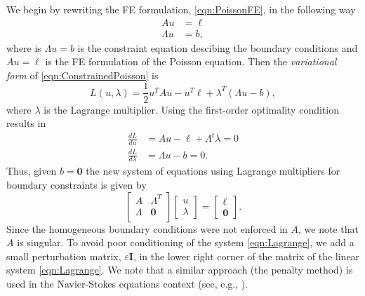 We begin by rewriting the FE formulation, \eqref{eqn:PoissonFE}, in the
following way
\begin{equation}
  \begin{split}
    A u &= \ell \\
    \Lambda u &= b,
  \end{split}
  \label{eqn:ConstrainedPoisson}
\end{equation}
where is $\Lambda u = b$ is the constraint equation descibing the boundary
conditions and $A u = \ell$ is the FE formulation of the Poisson equation.
Then the \emph{variational form} of \eqref{eqn:ConstrainedPoisson} is
\begin{equation}
  L(u,\lambda) = \frac{1}{2}u^T A u - u^T \ell + \lambda^T (\Lambda u - b),
  \label{eqn:Variational}
\end{equation}
where $\lambda$ is the Lagrange multiplier. Using the first-order optimality
condition results in
\begin{equation}
  \begin{split}
    \frac{d L}{du} &= Au - \ell + \Lambda^t \lambda = 0 \\
    \frac{d L}{d\lambda} &= \Lambda u - b = 0.
  \end{split}
  \label{eqn:Condition}
\end{equation}
Thus, given $b = \mathbf{0}$ the new system of equations using Lagrange
multipliers for boundary constraints is given by
\begin{equation}
  \begin{bmatrix}
    A & \Lambda^T \\
    \Lambda &  \mathbf{0} \\
  \end{bmatrix} \begin{bmatrix}
    u \\ \lambda
  \end{bmatrix} = \begin{bmatrix}
    \ell \\ \mathbf{0}
  \end{bmatrix}.
  \label{eqn:Lagrange}
\end{equation}
Since the homogeneous boundary conditions were not enforced in $A$, we note that
$A$ is singular.  To avoid poor conditioning of the system \eqref{eqn:Lagrange},
we add a small perturbation matrix, $\varepsilon \mathbf{I}$, in the lower right
corner of the matrix of the linear system \eqref{eqn:Lagrange}. We note that a
similar approach (the penalty method) is used in the Navier-Stokes equations
context (see, e.g., \cite{Gunzburger89}).
